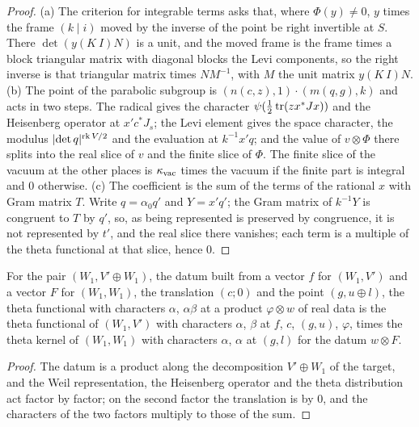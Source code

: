 \begin{proof}
(a) The criterion for integrable terms asks that, where $\Phi(y)\ne0$, $y$ times the frame $(k\mid i)$ moved by the inverse of the point be right invertible at $S$. There $\det(y(K\ I)N)$ is a unit, and the moved
frame is the frame times a block triangular matrix with diagonal blocks the Levi components, so the right inverse is that triangular matrix times $NM^{-1}$, with $M$ the unit matrix $y(K\ I)N$. (b) The point of the parabolic subgroup is
$(n(c,z),1)\cdot(m(q,g),k)$ and acts in two steps. The radical gives the character $\psi(\tfrac12\operatorname{tr}(zx^*Jx))$ and the Heisenberg operator at $x'c^*J_s$; the Levi element gives the space character, the
modulus $\lvert \det q\rvert^{\operatorname{rk}V/2}$ and the evaluation at $k^{-1}x'q$; and the value of $v\otimes\Phi$ there splits into the real slice of $v$ and the finite slice of $\Phi$. The finite slice of the vacuum
at the other places is $\kappa_{\rm vac}$ times the vacuum if the finite part is integral and $0$ otherwise. (c) The coefficient is the sum of the terms of the rational $x$ with Gram matrix $T$. Write
$q=\alpha_0q'$ and $Y=x'q'$; the Gram matrix of $k^{-1}Y$ is congruent to $T$ by $q'$, so, as being represented is preserved by congruence, it is not represented by $t'$, and the real slice there vanishes; each term is
a multiple of the theta functional at that slice, hence $0$.
\end{proof}

\begin{lemma}\label{lem:product-formula}
For the pair $(W_1,V'\oplus W_1)$, the datum built from a vector $f$ for $(W_1,V')$ and a vector $F$ for $(W_1,W_1)$, the translation $(c;0)$ and the point $(g,u\oplus l)$, the theta functional with characters
$\alpha$, $\alpha\beta$ at a product $\varphi\otimes w$ of real data is the theta functional of $(W_1,V')$ with characters $\alpha$, $\beta$ at $f$, $c$, $(g,u)$, $\varphi$, times the theta kernel of $(W_1,W_1)$ with
characters $\alpha$, $\alpha$ at $(g,l)$ for the datum $w\otimes F$.
\end{lemma}

\begin{proof}
The datum is a product along the decomposition $V'\oplus W_1$ of the target, and the Weil representation, the Heisenberg operator and the theta distribution act factor by factor; on the second factor the
translation is by $0$, and the characters of the two factors multiply to those of the sum.
\end{proof}

